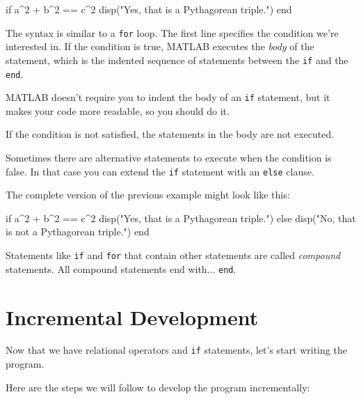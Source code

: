 \begin{code}
if a^2 + b^2 == c^2
    disp("Yes, that is a Pythagorean triple.")
end
\end{code}

The syntax is similar to a {\tt for} loop.  The first line
specifies the condition we're interested in.  If the condition is true, 
MATLAB executes the {\em body} of the statement, which is the indented sequence of
statements between the {\tt if} and the {\tt end}.


MATLAB doesn't require you to indent the body of an {\tt if}
statement, but it makes your code more readable, so you should do it.

If the condition is not satisfied, the statements in the body are
not executed. 

Sometimes there are alternative statements to
execute when the condition is false.  In that case you can extend
the {\tt if} statement with an {\tt else} clause.


The complete version of the previous example might look like this:

\begin{code}
if a^2 + b^2 == c^2
    disp("Yes, that is a Pythagorean triple.")
else
    disp("No, that is not a Pythagorean triple.")
end
\end{code}

Statements like {\tt if} and {\tt for} that contain other statements
are called \emph{compound} statements.  All compound statements end
with... {\tt end}.




\section{Incremental Development}
\label{increxample}

Now that we have relational operators and {\tt if} statements, let's start writing
the program.

Here are the steps we will follow to develop the program incrementally:

